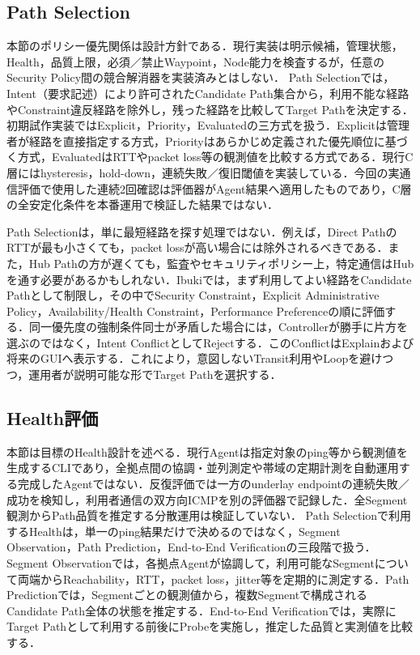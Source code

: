 \documentclass[11pt,a4paper,twoside]{ltjsarticle}
\begin{document}
\subsection{Path Selection}
本節のポリシー優先関係は設計方針である．現行実装は明示候補，管理状態，Health，品質上限，必須／禁止Waypoint，Node能力を検査するが，任意のSecurity Policy間の競合解消器を実装済みとはしない．
Path Selectionでは，Intent（要求記述）により許可されたCandidate Path集合から，利用不能な経路やConstraint違反経路を除外し，残った経路を比較してTarget Pathを決定する．初期試作実装ではExplicit，Priority，Evaluatedの三方式を扱う．Explicitは管理者が経路を直接指定する方式，Priorityはあらかじめ定義された優先順位に基づく方式，EvaluatedはRTTやpacket loss等の観測値を比較する方式である．現行C層にはhysteresis，hold-down，連続失敗／復旧閾値を実装している．今回の実通信評価で使用した連続2回確認は評価器がAgent結果へ適用したものであり，C層の全安定化条件を本番運用で検証した結果ではない．

Path Selectionは，単に最短経路を探す処理ではない．例えば，Direct PathのRTTが最も小さくても，packet lossが高い場合には除外されるべきである．また，Hub Pathの方が遅くても，監査やセキュリティポリシー上，特定通信はHubを通す必要があるかもしれない．Ibukiでは，まず利用してよい経路をCandidate Pathとして制限し，その中でSecurity Constraint，Explicit Administrative Policy，Availability/Health Constraint，Performance Preferenceの順に評価する．同一優先度の強制条件同士が矛盾した場合には，Controllerが勝手に片方を選ぶのではなく，Intent ConflictとしてRejectする．このConflictはExplainおよび将来のGUIへ表示する．これにより，意図しないTransit利用やLoopを避けつつ，運用者が説明可能な形でTarget Pathを選択する．

\subsection{Health評価}
本節は目標のHealth設計を述べる．現行Agentは指定対象のping等から観測値を生成するCLIであり，全拠点間の協調・並列測定や帯域の定期計測を自動運用する完成したAgentではない．反復評価では一方のunderlay endpointの連続失敗／成功を検知し，利用者通信の双方向ICMPを別の評価器で記録した．全Segment観測からPath品質を推定する分散運用は検証していない．
Path Selectionで利用するHealthは，単一のping結果だけで決めるのではなく，Segment Observation，Path Prediction，End-to-End Verificationの三段階で扱う．Segment Observationでは，各拠点Agentが協調して，利用可能なSegmentについて両端からReachability，RTT，packet loss，jitter等を定期的に測定する．Path Predictionでは，Segmentごとの観測値から，複数Segmentで構成されるCandidate Path全体の状態を推定する．End-to-End Verificationでは，実際にTarget Pathとして利用する前後にProbeを実施し，推定した品質と実測値を比較する．
\end{document}
